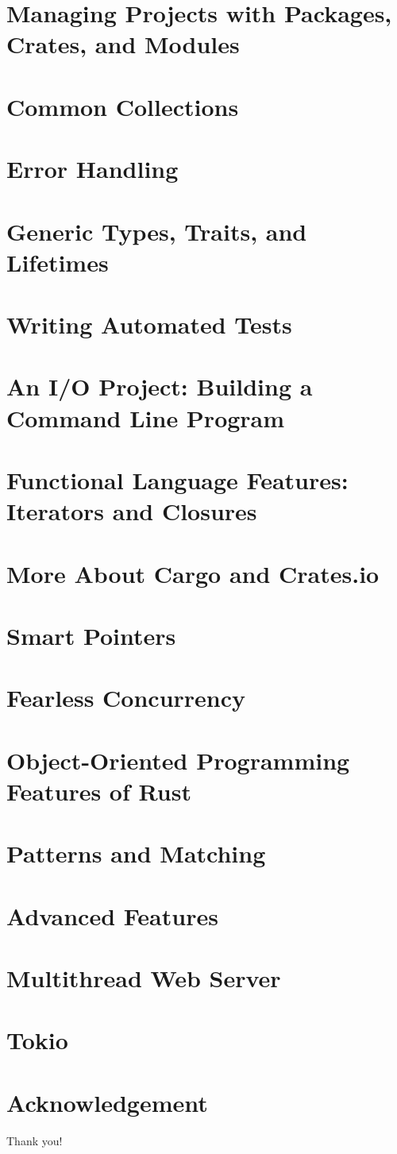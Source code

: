 \documentclass{beamer}
\begin{document}
\section{Managing Projects with Packages, Crates, and Modules}
\section{Common Collections}
\section{Error Handling}
\section{Generic Types, Traits, and Lifetimes}
\section{Writing Automated Tests}
\section{An I/O Project: Building a Command Line Program}
\section{Functional Language Features: Iterators and Closures}
\section{More About Cargo and Crates.io}
\section{Smart Pointers}
\section{Fearless Concurrency}
\section{Object-Oriented Programming Features of Rust}
\section{Patterns and Matching}
\section{Advanced Features}
\section{Multithread Web Server}
\section{Tokio}

\section*{Acknowledgement}
\begin{frame}
	\Huge{\centerline{Thank you!}}
\end{frame}
\end{document}
